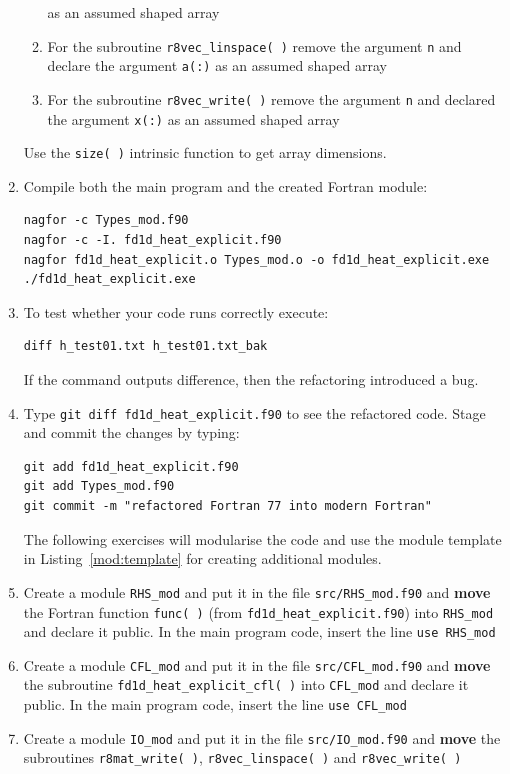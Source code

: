 \documentclass[12pt]{article}
\begin{document}
\begin{enumerate}
\begin{enumerate}
as an assumed shaped array
\item For the subroutine \texttt{r8vec\_linspace( )} remove the argument \texttt{n} and declare the argument \texttt{a(:)} as
an assumed shaped array
\item For the subroutine \texttt{r8vec\_write( )} remove the argument \texttt{n} and declared the argument \texttt{x(:)} as
an assumed shaped array
\end{enumerate}
Use the \texttt{size( )} intrinsic function to get array dimensions. 
\item Compile both the main program and the created Fortran module:
\begin{verbatim}
nagfor -c Types_mod.f90
nagfor -c -I. fd1d_heat_explicit.f90
nagfor fd1d_heat_explicit.o Types_mod.o -o fd1d_heat_explicit.exe
./fd1d_heat_explicit.exe
\end{verbatim}
\item To test whether your code runs correctly execute:
\begin{verbatim}
diff h_test01.txt h_test01.txt_bak
\end{verbatim}
If the command outputs difference, then the refactoring introduced a bug.
\item Type \texttt{git diff fd1d\_heat\_explicit.f90} to see the refactored code. Stage and commit
the changes by typing: 
\begin{verbatim}
git add fd1d_heat_explicit.f90
git add Types_mod.f90
git commit -m "refactored Fortran 77 into modern Fortran"
\end{verbatim}
The following exercises will modularise the code and use the module template in
  Listing~\ref{mod:template} for creating additional modules.
\item Create a module \texttt{RHS\_mod} and put it in the file \texttt{src/RHS\_mod.f90} and {\bf move} the 
Fortran function \texttt{func( )} (from \texttt{fd1d\_heat\_explicit.f90}) into \texttt{RHS\_mod} and declare it public. In the main program code, 
insert the line \texttt{use RHS\_mod} 
\item Create a module \texttt{CFL\_mod} and put it in the file \texttt{src/CFL\_mod.f90} and {\bf move} the
  subroutine \texttt{fd1d\_heat\_explicit\_cfl( )} into \texttt{CFL\_mod} and declare it
  public. In the main program
code, insert the line \texttt{use CFL\_mod}
\item Create a module \texttt{IO\_mod} and put it in the file \texttt{src/IO\_mod.f90} and {\bf move}
  the subroutines \texttt{r8mat\_write( )}, \texttt{r8vec\_linspace( )} and \texttt{r8vec\_write( )}

\end{enumerate}
\end{document}
